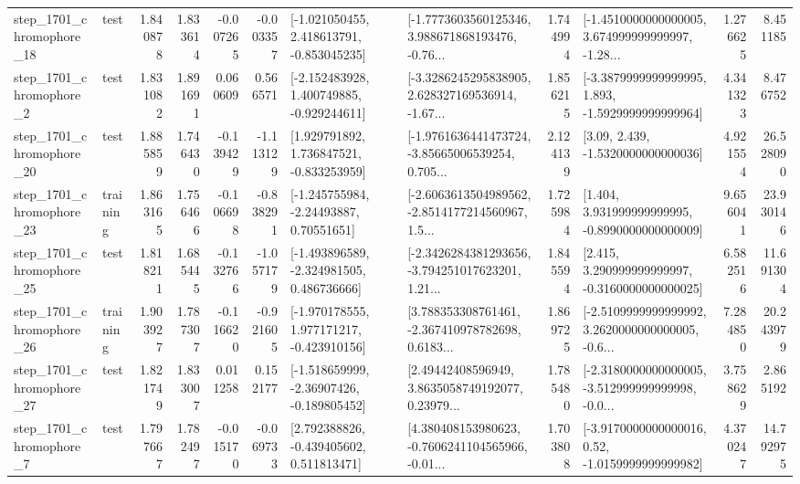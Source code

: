 \begin{tabular}{llrrrrllrlrr}
 step\_1701\_chromophore\_18 &      test &      1.840878 &    1.833614 &     -0.007265 & -0.003357 &   [-1.021050455, 2.418613791, -0.853045235] &  [-1.7773603560125346, 3.988671868193476, -0.76... &       1.744994 &  [-1.4510000000000005, 3.674999999999997, -1.28... &            1.276625 &          8.451185 \\
  step\_1701\_chromophore\_2 &      test &      1.831082 &    1.891691 &      0.060609 &  0.566571 &   [-2.152483928, 1.400749885, -0.929244611] &  [-3.3286245295838905, 2.628327169536914, -1.67... &       1.856215 &  [-3.3879999999999995, 1.893, -1.5929999999999964] &            4.341323 &          8.476752 \\
 step\_1701\_chromophore\_20 &      test &      1.885859 &    1.746430 &     -0.139429 & -1.113129 &    [1.929791892, 1.736847521, -0.833253959] &  [-1.9761636441473724, -3.85665006539254, 0.705... &       2.124139 &                 [3.09, 2.439, -1.5320000000000036] &            4.921554 &         26.528090 \\
 step\_1701\_chromophore\_23 &  training &      1.863165 &    1.756466 &     -0.106698 & -0.838291 &     [-1.245755984, -2.24493887, 0.70551651] &  [-2.6063613504989562, -2.8514177214560967, 1.5... &       1.725984 &    [1.404, 3.931999999999995, -0.8990000000000009] &            9.656041 &         23.930146 \\
 step\_1701\_chromophore\_25 &      test &      1.818211 &    1.685445 &     -0.132766 & -1.057179 &   [-1.493896589, -2.324981505, 0.486736666] &  [-2.3426284381293656, -3.794251017623201, 1.21... &       1.845594 &    [2.415, 3.290999999999997, -0.3160000000000025] &            6.582516 &         11.691304 \\
 step\_1701\_chromophore\_26 &  training &      1.903927 &    1.787307 &     -0.116620 & -0.921605 &   [-1.970178555, 1.977171217, -0.423910156] &  [3.788353308761461, -2.367410978782698, 0.6183... &       1.869725 &  [-2.5109999999999992, 3.2620000000000005, -0.6... &            7.284850 &         20.243979 \\
 step\_1701\_chromophore\_27 &      test &      1.821749 &    1.833007 &      0.011258 &  0.152177 &   [-1.518659999, -2.36907426, -0.189805452] &  [2.49442408596949, 3.8635058749192077, 0.23979... &       1.785480 &  [-2.3180000000000005, -3.512999999999998, -0.0... &            3.758629 &          2.865192 \\
  step\_1701\_chromophore\_7 &      test &      1.797667 &    1.782497 &     -0.015170 & -0.069733 &    [2.792388826, -0.439405602, 0.511813471] &  [4.380408153980623, -0.7606241104565966, -0.01... &       1.703808 &   [-3.9170000000000016, 0.52, -1.0159999999999982] &            4.370247 &         14.792975 \\

\end{tabular}
